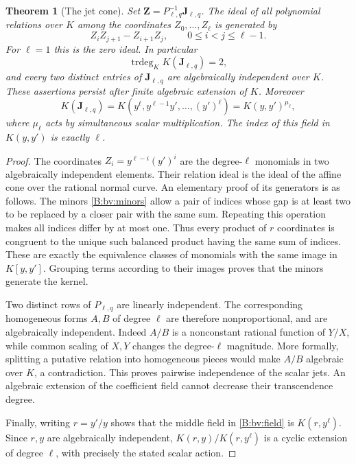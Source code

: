 \documentclass[11pt,a4paper]{article}
\newtheorem{theorem}{Theorem}[section]
\theoremstyle{definition}
\theoremstyle{remark}
\numberwithin{equation}{section}
\begin{document}
\begin{theorem}[The jet cone]\label{B:bv:jetcone}
Set $\mathbf Z=P_{\ell,q}^{-1}\mathbf J_{\ell,q}$.
The ideal of all polynomial relations over $K$ among the
coordinates $Z_0,\ldots,Z_\ell$ is generated by
\begin{equation}\label{B:bv:minors}
 Z_iZ_{j+1}-Z_{i+1}Z_j,
 \qquad 0\le i<j\le\ell-1.
\end{equation}
For $\ell=1$ this is the zero ideal. In particular
\[
 \operatorname{trdeg}_{K}K(\mathbf J_{\ell,q})=2,
\]
and every two distinct entries of $\mathbf J_{\ell,q}$ are
algebraically independent over $K$. These assertions persist
after finite algebraic extension of $K$.
Moreover
\begin{equation}\label{B:bv:field}
 K(\mathbf J_{\ell,q})
 =K(y^\ell,y^{\ell-1}y',\ldots,(y')^\ell)
 =K(y,y')^{\mu_\ell},
\end{equation}
where $\mu_\ell$ acts by simultaneous scalar multiplication.
The index of this field in $K(y,y')$ is exactly $\ell$.
\end{theorem}

\begin{proof}
The coordinates $Z_i=y^{\ell-i}(y')^i$ are the degree-$\ell$
monomials in two algebraically independent elements. Their
relation ideal is the ideal of the affine cone over the rational
normal curve. An elementary proof of its generators is as follows.
The minors \eqref{B:bv:minors} allow a pair of indices whose gap
is at least two to be replaced by a closer pair with the same
sum. Repeating this operation makes all indices differ by at
most one. Thus every product of $r$ coordinates is congruent
to the unique such balanced product having the same sum of
indices. These are exactly the equivalence classes of monomials
with the same image in $K[y,y']$. Grouping terms according to
their images proves that the minors generate the kernel.

Two distinct rows of $P_{\ell,q}$ are linearly independent.
The corresponding homogeneous forms $A,B$ of degree $\ell$
are therefore nonproportional, and are algebraically independent.
Indeed $A/B$ is a nonconstant rational function of $Y/X$, while
common scaling of $X,Y$ changes the degree-$\ell$ magnitude.
More formally, splitting a putative relation into homogeneous
pieces would make $A/B$ algebraic over $K$, a contradiction.
This proves pairwise independence of the scalar jets.
An algebraic extension of the coefficient field cannot decrease
their transcendence degree.

Finally, writing $r=y'/y$ shows that the middle field in
\eqref{B:bv:field} is $K(r,y^\ell)$. Since $r,y$ are algebraically
independent, $K(r,y)/K(r,y^\ell)$ is a cyclic extension of degree
$\ell$, with precisely the stated scalar action.
\end{proof}
\end{document}
